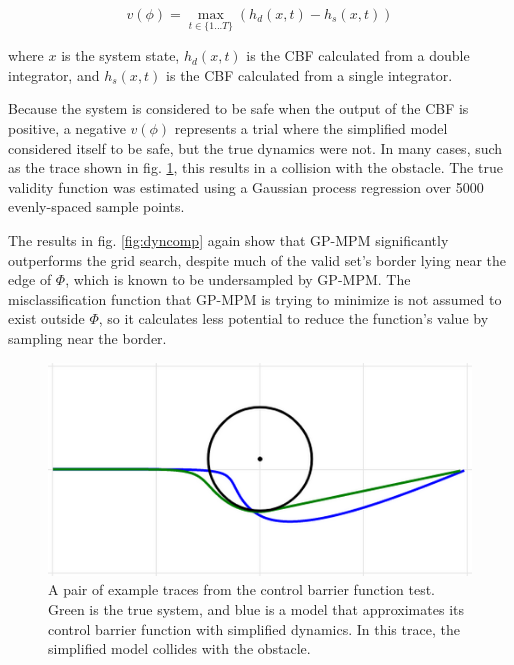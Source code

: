 \documentclass[12pt, conference]{IEEEtran}
\begin{document}
\begin{equation}
    v(\phi) = \max_{t\in\{1...T\}}(h_d(x,t)-h_s(x,t))
\end{equation}

where $x$ is the system state, $h_d(x,t)$ is the CBF calculated from a double integrator, and $h_s(x,t)$ is the CBF calculated from a single integrator.

Because the system is considered to be safe when the output of the CBF is positive, a negative $v(\phi)$ represents a trial where the simplified model considered itself to be safe, but the true dynamics were not. In many cases, such as the trace shown in fig. \ref{fig:dyntrace}, this results in a collision with the obstacle. The true validity function was estimated using a Gaussian process regression over 5000 evenly-spaced sample points.

The results in fig. \ref{fig:dyncomp} again show that GP-MPM significantly outperforms the grid search, despite much of the valid set's border lying near the edge of $\Phi$, which is known to be undersampled by GP-MPM. The misclassification function that GP-MPM is trying to minimize is not assumed to exist outside $\Phi$, so it calculates less potential to reduce the function's value by sampling near the border.

\begin{figure}[htbp]
    \centerline{\includegraphics[width=0.9\columnwidth]{img/setup_dyn.png}}
    \caption{A pair of example traces from the control barrier function test. Green is the true system, and blue is a model that approximates its control barrier function with simplified dynamics. In this trace, the simplified model collides with the obstacle.}
    \label{fig:dyntrace}
\end{figure}
\end{document}
